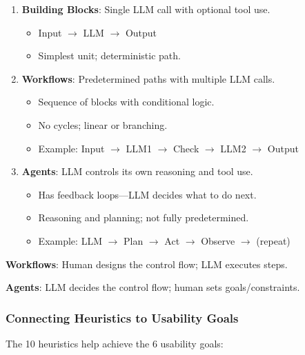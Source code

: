 \begin{enumerate}
  \item \textbf{Building Blocks}: Single LLM call with optional tool use.
  \begin{itemize}
    \item Input $\to$ LLM $\to$ Output
    \item Simplest unit; deterministic path.
  \end{itemize}
  
  \item \textbf{Workflows}: Predetermined paths with multiple LLM calls.
  \begin{itemize}
    \item Sequence of blocks with conditional logic.
    \item No cycles; linear or branching.
    \item Example: Input $\to$ LLM1 $\to$ Check $\to$ LLM2 $\to$ Output
  \end{itemize}
  
  \item \textbf{Agents}: LLM controls its own reasoning and tool use.
  \begin{itemize}
    \item Has feedback loops---LLM decides what to do next.
    \item Reasoning and planning; not fully predetermined.
    \item Example: LLM $\to$ Plan $\to$ Act $\to$ Observe $\to$ (repeat)
  \end{itemize}
\end{enumerate}

\begin{tipbox}
\textbf{Workflows}: Human designs the control flow; LLM executes steps.

\textbf{Agents}: LLM decides the control flow; human sets goals/constraints.
\end{tipbox}

\subsubsection*{Connecting Heuristics to Usability Goals}

The 10 heuristics help achieve the 6 usability goals:

